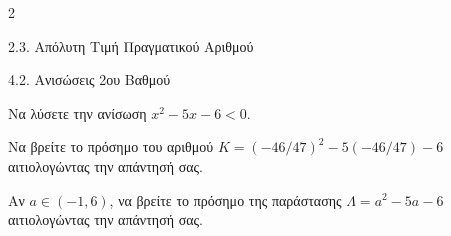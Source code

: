\begin{ylh}{2}
    \item 2.3. Απόλυτη Τιμή Πραγματικού Αριθμού
    \item 4.2. Ανισώσεις 2ου Βαθμού
\end{ylh}

\begin{alist}
\item Να λύσετε την ανίσωση $x^2 - 5x - 6 < 0$. 
\item Να βρείτε το πρόσημο του αριθμού $K = (-46/47)^2 - 5(-46/47) - 6$ αιτιολογώντας την απάντησή σας. 
\item Αν $a \in (-1, 6)$, να βρείτε το πρόσημο της παράστασης $\Lambda = a^2 - 5a - 6$ αιτιολογώντας την απάντησή σας. 
\end{alist}


